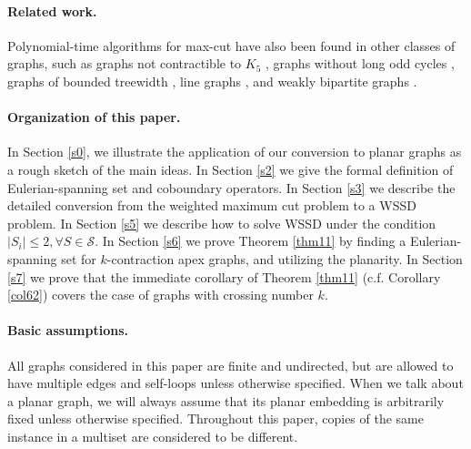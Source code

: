 \documentclass[10pt,fleqn]{article}
\newcommand{\mc}[1]{\mathcal{#1}}
\begin{document}
	\paragraph{\bf Related work.} Polynomial-time algorithms for max-cut have also been found in other classes of graphs, such as graphs not contractible to $K_5$ \cite{92}, graphs without long odd cycles \cite{94}, graphs of bounded treewidth \cite{106}, line graphs \cite{107}, and weakly bipartite graphs \cite{91}.
	\paragraph{\bf Organization of this paper. } In Section \ref{s0}, we illustrate the application of our conversion to planar graphs as a rough sketch of the main ideas. In Section \ref{s2} we give the formal definition of Eulerian-spanning set and coboundary operators. In Section \ref{s3} we describe the detailed conversion from the weighted maximum cut problem to a WSSD problem. In Section \ref{s5} we describe how to solve WSSD under the condition $|S_i|\leq 2,\forall S\in\mc{S}$. In Section \ref{s6} we prove Theorem \ref{thm11} by finding a Eulerian-spanning set for $k$-contraction apex graphs, and utilizing the planarity. In Section \ref{s7} we prove that the immediate corollary of Theorem \ref{thm11} (c.f. Corollary \ref{col62}) covers the case of graphs with crossing number $k$. \par
	\paragraph{\bf Basic assumptions. }All graphs considered in this paper are finite and undirected, but are allowed to have multiple edges and self-loops unless otherwise specified. When we talk about a planar graph, we will always assume that its planar embedding is arbitrarily fixed unless otherwise specified. Throughout this paper, copies of the same instance in a multiset are considered to be different.
	
	
\end{document}
